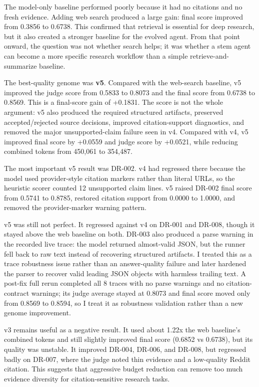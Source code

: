 \documentclass[10pt]{article}
\begin{document}
The model-only baseline performed poorly because it had no citations and no fresh evidence. Adding web search produced a large gain: final score improved from 0.3856 to 0.6738. This confirmed that retrieval is essential for deep research, but it also created a stronger baseline for the evolved agent. From that point onward, the question was not whether search helps; it was whether a stem agent can become a more specific research workflow than a simple retrieve-and-summarize baseline.

The best-quality genome was \textbf{v5}. Compared with the web-search baseline, v5 improved the judge score from 0.5833 to 0.8073 and the final score from 0.6738 to 0.8569. This is a final-score gain of +0.1831. The score is not the whole argument: v5 also produced the required structured artifacts, preserved accepted/rejected source decisions, improved citation-support diagnostics, and removed the major unsupported-claim failure seen in v4. Compared with v4, v5 improved final score by +0.0559 and judge score by +0.0521, while reducing combined tokens from 450,061 to 354,487.

The most important v5 result was DR-002. v4 had regressed there because the model used provider-style citation markers rather than literal URLs, so the heuristic scorer counted 12 unsupported claim lines. v5 raised DR-002 final score from 0.5741 to 0.8785, restored citation support from 0.0000 to 1.0000, and removed the provider-marker warning pattern.

v5 was still not perfect. It regressed against v4 on DR-001 and DR-008, though it stayed above the web baseline on both. DR-003 also produced a parse warning in the recorded live trace: the model returned almost-valid JSON, but the runner fell back to raw text instead of recovering structured artifacts. I treated this as a trace robustness issue rather than an answer-quality failure and later hardened the parser to recover valid leading JSON objects with harmless trailing text. A post-fix full rerun completed all 8 traces with no parse warnings and no citation-contract warnings; its judge average stayed at 0.8073 and final score moved only from 0.8569 to 0.8594, so I treat it as robustness validation rather than a new genome improvement.

v3 remains useful as a negative result. It used about 1.22x the web baseline's combined tokens and still slightly improved final score (0.6852 vs 0.6738), but its quality was unstable. It improved DR-004, DR-006, and DR-008, but regressed badly on DR-007, where the judge noted thin evidence and a low-quality Reddit citation. This suggests that aggressive budget reduction can remove too much evidence diversity for citation-sensitive research tasks.
\end{document}
